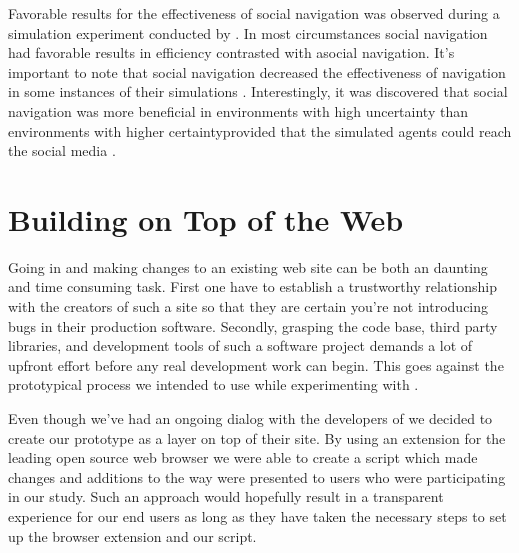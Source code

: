 Favorable results for the effectiveness of social navigation was observed
during a simulation experiment conducted by \citeauthor{riedl03}. In most
circumstances social navigation had favorable results in efficiency contrasted
with asocial navigation. It's important to note that social navigation
decreased the effectiveness of navigation in some instances of their
simulations \citeyearpar[]{riedl03}.
Interestingly, it was discovered that social navigation was more
beneficial in environments with high uncertainty%
than environments with higher certainty\dash{}provided that the
simulated agents could reach the social media
\citeyearpar[]{riedl03}. 

\section{Building on Top of the Web}
\label{section:building.on.top.of.the.web}

Going in and making changes to an existing web site can be both an
daunting and time consuming task. First one have to establish a trustworthy
relationship with the creators of such a site so that they are certain
you're not introducing bugs in their production software. Secondly, grasping
the code base, third party libraries, and development tools of such a software
project demands a lot of upfront effort before any real development work can
begin. This goes against the prototypical process we intended to use while
experimenting with \urort{}.

Even though we've had an ongoing dialog with the developers of \urort{} we
decided to create our prototype as a layer on top of their site.
By using an
extension
for the leading open source%
web browser we were able to create a script which
made changes and additions to the way \urort{}
were presented to users who were participating in our study.
Such an approach would hopefully result in a transparent experience for our
end users as long as they have taken the necessary steps to set up the browser
extension and our script.

